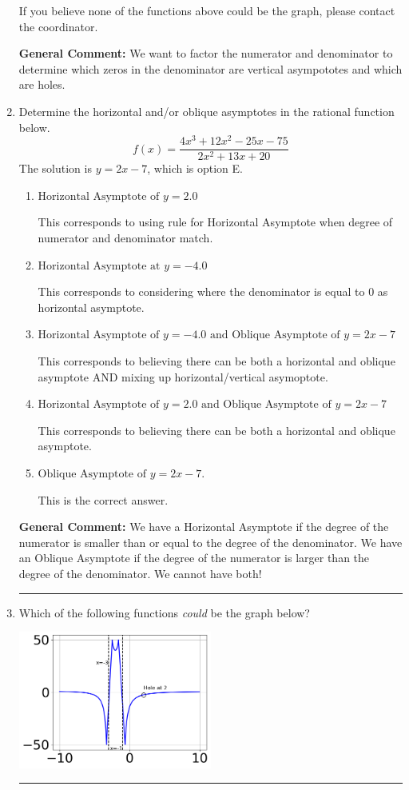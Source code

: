 \documentclass{extbook}[14pt]
\newcommand{\litem}[1]{\item #1

\rule{\textwidth}{0.4pt}}
\begin{document}
\begin{enumerate}
{\begin{enumerate}[label=\Alph*.]
If you believe none of the functions above could be the graph, please contact the coordinator.
\end{enumerate}

\textbf{General Comment:} We want to factor the numerator and denominator to determine which zeros in the denominator are vertical asympototes and which are holes.
}
\litem{
Determine the horizontal and/or oblique asymptotes in the rational function below.
\[ f(x) = \frac{4x^{3} +12 x^{2} -25 x -75}{2x^{2} +13 x + 20} \]The solution is \( y = 2x -7 \), which is option E.\begin{enumerate}[label=\Alph*.]
\item \( \text{Horizontal Asymptote of } y = 2.0  \)

This corresponds to using rule for Horizontal Asymptote when degree of numerator and denominator match.
\item \( \text{Horizontal Asymptote at } y = -4.0 \)

This corresponds to considering where the denominator is equal to 0 as horizontal asymptote.
\item \( \text{Horizontal Asymptote of } y = -4.0 \text{ and Oblique Asymptote of } y = 2x -7 \)

This corresponds to believing there can be both a horizontal and oblique asymptote AND mixing up horizontal/vertical asymoptote.
\item \( \text{Horizontal Asymptote of } y = 2.0 \text{ and Oblique Asymptote of } y = 2x -7 \)

This corresponds to believing there can be both a horizontal and oblique asymptote.
\item \( \text{Oblique Asymptote of } y = 2x -7. \)

This is the correct answer.
\end{enumerate}

\textbf{General Comment:} We have a Horizontal Asymptote if the degree of the numerator is smaller than or equal to the degree of the denominator. We have an Oblique Asymptote if the degree of the numerator is larger than the degree of the denominator. We cannot have both!
}
\litem{
Which of the following functions \textit{could} be the graph below?

\begin{center}
    \includegraphics[width=0.5\textwidth]{../Figures/identifyGraphOfRationalFunctionB.png}
\end{center}


}
\end{enumerate}
\end{document}
